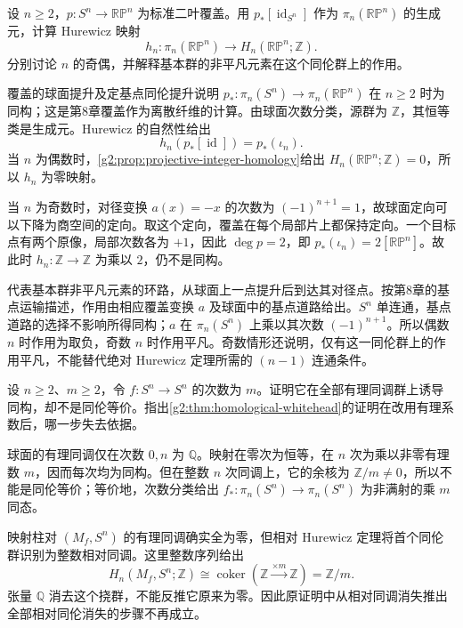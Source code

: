 \begin{exercise}\label{g2:ex:hurewicz-real-projective}
	设 \(n\ge2\)，\(p:S^n\to\mathbb{RP}^n\) 为标准二叶覆盖。用 \(p_*[\operatorname{id}_{S^n}]\) 作为 \(\pi_n(\mathbb{RP}^n)\) 的生成元，计算 Hurewicz 映射
	\[
		h_n:\pi_n(\mathbb{RP}^n)\longrightarrow H_n(\mathbb{RP}^n;\mathbb Z).
	\]
	分别讨论 \(n\) 的奇偶，并解释基本群的非平凡元素在这个同伦群上的作用。
\end{exercise}
\begin{solution}
	覆盖的球面提升及定基点同伦提升说明 \(p_*:\pi_n(S^n)\to\pi_n(\mathbb{RP}^n)\) 在 \(n\ge2\) 时为同构；这是第8章覆盖作为离散纤维的计算。由球面次数分类，源群为 \(\mathbb Z\)，其恒等类是生成元。Hurewicz 的自然性给出
	\[
		h_n(p_*[\operatorname{id}])=p_*(\iota_n).
	\]
	当 \(n\) 为偶数时，\cref{g2:prop:projective-integer-homology}给出 \(H_n(\mathbb{RP}^n;\mathbb Z)=0\)，所以 \(h_n\) 为零映射。

	当 \(n\) 为奇数时，对径变换 \(a(x)=-x\) 的次数为 \((-1)^{n+1}=1\)，故球面定向可以下降为商空间的定向。取这个定向，覆盖在每个局部片上都保持定向。一个目标点有两个原像，局部次数各为 \(+1\)，因此 \(\deg p=2\)，即 \(p_*(\iota_n)=2[\mathbb{RP}^n]\)。故此时 \(h_n:\mathbb Z\to\mathbb Z\) 为乘以 \(2\)，仍不是同构。

	代表基本群非平凡元素的环路，从球面上一点提升后到达其对径点。按第8章的基点运输描述，作用由相应覆盖变换 \(a\) 及球面中的基点道路给出。\(S^n\) 单连通，基点道路的选择不影响所得同构；\(a\) 在 \(\pi_n(S^n)\) 上乘以其次数 \((-1)^{n+1}\)。所以偶数 \(n\) 时作用为取负，奇数 \(n\) 时作用平凡。奇数情形还说明，仅有这一同伦群上的作用平凡，不能替代绝对 Hurewicz 定理所需的 \((n-1)\) 连通条件。
\end{solution}
\begin{exercise}\label{g2:ex:rational-homology-degree}
	设 \(n\ge2\)、\(m\ge2\)，令 \(f:S^n\to S^n\) 的次数为 \(m\)。证明它在全部有理同调群上诱导同构，却不是同伦等价。指出\cref{g2:thm:homological-whitehead}的证明在改用有理系数后，哪一步失去依据。
\end{exercise}
\begin{solution}
	球面的有理同调仅在次数 \(0,n\) 为 \(\mathbb Q\)。映射在零次为恒等，在 \(n\) 次为乘以非零有理数 \(m\)，因而每次均为同构。但在整数 \(n\) 次同调上，它的余核为 \(\mathbb Z/m\ne0\)，所以不能是同伦等价；等价地，次数分类给出 \(f_*:\pi_n(S^n)\to\pi_n(S^n)\) 为非满射的乘 \(m\) 同态。

	映射柱对 \((M_f,S^n)\) 的有理同调确实全为零，但相对 Hurewicz 定理将首个同伦群识别为整数相对同调。这里整数序列给出
	\[
		H_n(M_f,S^n;\mathbb Z)\cong\operatorname{coker}(\mathbb Z\xrightarrow{\times m}\mathbb Z)=\mathbb Z/m.
	\]
	张量 \(\mathbb Q\) 消去这个挠群，不能反推它原来为零。因此原证明中从相对同调消失推出全部相对同伦消失的步骤不再成立。
\end{solution}

